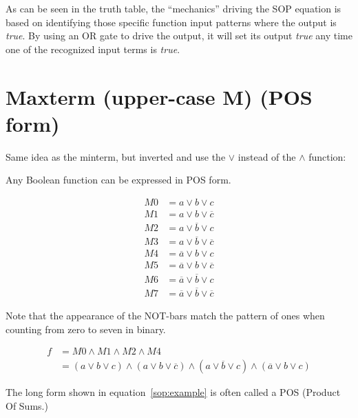 \documentclass[10pt]{article}
\begin{document}
As can be seen in the truth table, the ``mechanics'' driving the SOP equation is based
on identifying those specific function input patterns where the output is {\em true}.
By using an OR gate to drive the output, it will set its output {\em true} any time one 
of the recognized input terms is {\em true}.

\section{Maxterm (upper-case M) (POS form)}

Same idea as the minterm, but inverted and use the $\lor$ instead of the $\land$ function:

Any Boolean function can be expressed in POS form.


\begin{align}
M0 & = a \lor b \lor c \\
M1 & = a \lor b \lor \overline{c} \\
M2 & = a \lor \overline{b} \lor c \\
M3 & = a \lor \overline{b} \lor \overline{c} \\
M4 & = \overline{a} \lor b \lor c \\
M5 & = \overline{a} \lor b \lor \overline{c} \\
M6 & = \overline{a} \lor \overline{b} \lor c \\
M7 & = \overline{a} \lor \overline{b} \lor \overline{c}
\end{align}

Note that the appearance of the NOT-bars match the pattern of ones when counting
from zero to seven in binary.

\begin{align}
f &= M0 \land M1 \land M2 \land M4 \\
&= (a \lor b \lor c) \land 
	(a \lor b \lor \overline{c}) \land
	(a \lor \overline{b} \lor c) \land
	(\overline{a} \lor b \lor c) \label{sop:example}
\end{align}

The long form shown in equation~\ref{sop:example} is often called a POS (Product Of Sums.)
\end{document}
